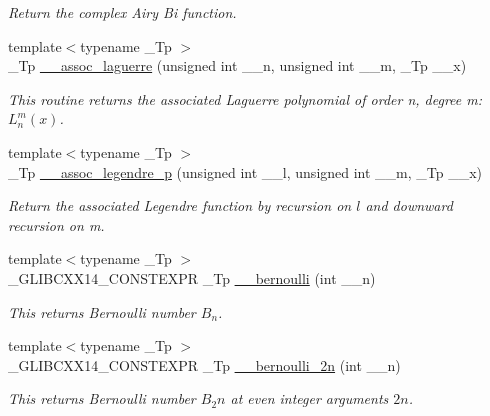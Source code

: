 \begin{DoxyCompactItemize}
\begin{DoxyCompactList}\small\item\em Return the complex Airy Bi function. \end{DoxyCompactList}\item 
{\footnotesize template$<$typename \+\_\+\+Tp $>$ }\\\+\_\+\+Tp \hyperlink{namespacestd_1_1____detail_a7d47c4512f7c6914f5504fde6ffa31fb}{\+\_\+\+\_\+assoc\+\_\+laguerre} (unsigned int \+\_\+\+\_\+n, unsigned int \+\_\+\+\_\+m, \+\_\+\+Tp \+\_\+\+\_\+x)
\begin{DoxyCompactList}\small\item\em This routine returns the associated Laguerre polynomial of order n, degree m\+: $ L_n^m(x) $. \end{DoxyCompactList}\item 
{\footnotesize template$<$typename \+\_\+\+Tp $>$ }\\\+\_\+\+Tp \hyperlink{namespacestd_1_1____detail_a8b31886e334427566b1b00d71052191b}{\+\_\+\+\_\+assoc\+\_\+legendre\+\_\+p} (unsigned int \+\_\+\+\_\+l, unsigned int \+\_\+\+\_\+m, \+\_\+\+Tp \+\_\+\+\_\+x)
\begin{DoxyCompactList}\small\item\em Return the associated Legendre function by recursion on $ l $ and downward recursion on m. \end{DoxyCompactList}\item 
{\footnotesize template$<$typename \+\_\+\+Tp $>$ }\\\+\_\+\+G\+L\+I\+B\+C\+X\+X14\+\_\+\+C\+O\+N\+S\+T\+E\+X\+PR \+\_\+\+Tp \hyperlink{namespacestd_1_1____detail_a5dc6cb42a6bcd3258371b6cc93ee12f0}{\+\_\+\+\_\+bernoulli} (int \+\_\+\+\_\+n)
\begin{DoxyCompactList}\small\item\em This returns Bernoulli number $ B_n $. \end{DoxyCompactList}\item 
{\footnotesize template$<$typename \+\_\+\+Tp $>$ }\\\+\_\+\+G\+L\+I\+B\+C\+X\+X14\+\_\+\+C\+O\+N\+S\+T\+E\+X\+PR \+\_\+\+Tp \hyperlink{namespacestd_1_1____detail_a72c7ddb85ace9619af583ca2acdb0a9b}{\+\_\+\+\_\+bernoulli\+\_\+2n} (int \+\_\+\+\_\+n)
\begin{DoxyCompactList}\small\item\em This returns Bernoulli number $ B_2n $ at even integer arguments $ 2n $. \end{DoxyCompactList}\item 

\end{DoxyCompactItemize}
